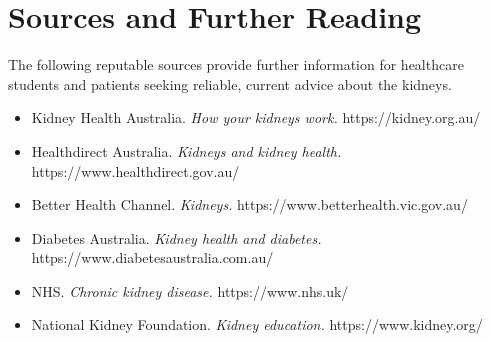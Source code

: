 \section*{Sources and Further Reading}
The following reputable sources provide further information for healthcare students and patients seeking reliable, current advice about the kidneys.
\begin{itemize}
    \item Kidney Health Australia. \textit{How your kidneys work.} https://kidney.org.au/
    \item Healthdirect Australia. \textit{Kidneys and kidney health.} https://www.healthdirect.gov.au/
    \item Better Health Channel. \textit{Kidneys.} https://www.betterhealth.vic.gov.au/
    \item Diabetes Australia. \textit{Kidney health and diabetes.} https://www.diabetesaustralia.com.au/
    \item NHS. \textit{Chronic kidney disease.} https://www.nhs.uk/
    \item National Kidney Foundation. \textit{Kidney education.} https://www.kidney.org/
\end{itemize}
